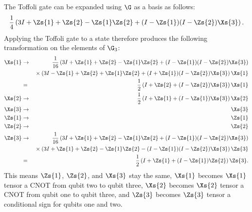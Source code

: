 The Toffoli gate can be expanded using $\G$ as a basis as follows:
\begin{equation}
	\frac{1}{4} \left( 3 I + \Zs{1} + \Zs{2} - \Zs{1} \Zs{2} + (I - \Zs{1}) (I -
	\Zs{2}) \Xs{3}
	\right).
\end{equation}
Applying the Toffoli gate to a state therefore produces the following
transformation on the elements of $\G_3$:
\begin{eqnarray}
	\Xs{1} & \rightarrow & \frac{1}{16} \left( 3 I + \Zs{1} + \Zs{2} - \Zs{1} \Zs{2}
	+ (I - \Zs{1}) (I - \Zs{2}) \Xs{3} \right) \nonumber \\
	& & \mbox{} \times \left( 3 I - \Zs{1} + \Zs{2} + \Zs{1}
	\Zs{2} + (I + \Zs{1}) (I - \Zs{2}) \Xs{3} \right) \Xs{1} \nonumber \\
	& = & \frac{1}{2} \left(I + \Zs{2} + (I - \Zs{2}) \Xs{3} \right) \Xs{1}
	\nonumber \\
	\Xs{2} & \rightarrow & \frac{1}{2} \left(I + \Zs{1} + (I - \Zs{1}) \Xs{3}
	\right) \Xs{2} \nonumber \\
	\Xs{3} & \rightarrow & \Xs{3} \label{eq-toffoli} \\
	\Zs{1} & \rightarrow & \Zs{1} \nonumber \\
	\Zs{2} & \rightarrow & \Zs{2} \nonumber \\
	\Zs{3} & \rightarrow & \frac{1}{16} \left( 3 I + \Zs{1} + \Zs{2} - \Zs{1} \Zs{2}
	+ (I - \Zs{1}) (I - \Zs{2}) \Xs{3} \right) \nonumber \\
	& & \mbox{} \times \left( 3 I + \Zs{1} + \Zs{2} - \Zs{1}
	\Zs{2} - (I - \Zs{1}) (I - \Zs{2}) \Xs{3} \right) \Zs{3} \nonumber \\
	& = & \frac{1}{2} \left(I + \Zs{1} + (I - \Zs{1}) \Zs{2} \right) \Zs{3}.
	\nonumber
\end{eqnarray}
This means $\Zs{1}$, $\Zs{2}$, and $\Xs{3}$ stay the same, $\Xs{1}$ becomes
$\Xs{1}$ tensor a CNOT from qubit two to qubit three, $\Xs{2}$ becomes $\Xs{2}$
tensor a CNOT from qubit one to qubit three, and $\Zs{3}$ becomes $\Zs{3}$
tensor a conditional sign for qubits one and two.

